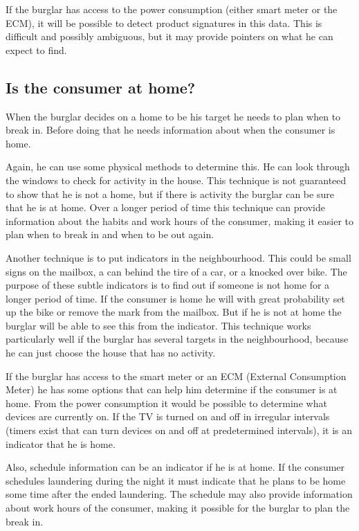 If the burglar has access to the power consumption (either smart meter or the ECM), it will be possible to detect product signatures in this data.
This is difficult and possibly ambiguous, but it may provide pointers on what he can expect to find.

\subsection{Is the consumer at home?}
When the burglar decides on a home to be his target he needs to plan when to break in.
Before doing that he needs information about when the consumer is home.

Again, he can use some physical methods to determine this.
He can look through the windows to check for activity in the house.
This technique is not guaranteed to show that he is not a home, but if there is activity the burglar can be sure that he is at home.
Over a longer period of time this technique can provide information about the habits and work hours of the consumer, making it easier to plan when to break in and when to be out again.

Another technique is to put indicators in the neighbourhood.
This could be small signs on the mailbox, a can behind the tire of a car, or a knocked over bike.
The purpose of these subtle indicators is to find out if someone is not home for a longer period of time.
If the consumer is home he will with great probability set up the bike or remove the mark from the mailbox.
But if he is not at home the burglar will be able to see this from the indicator.
This technique works particularly well if the burglar has several targets in the neighbourhood, because he can just choose the house that has no activity.

If the burglar has access to the smart meter or an ECM (External Consumption Meter) he has some options that can help him determine if the consumer is at home.
From the power consumption it would be possible to determine what devices are currently on. 
If the TV is turned on and off in irregular intervals (timers exist that can turn devices on and off at predetermined intervals), it is an indicator that he is home.

Also, schedule information can be an indicator if he is at home.
If the consumer schedules laundering during the night it must indicate that he plans to be home some time after the ended laundering.
The schedule may also provide information about work hours of the consumer, making it possible for the burglar to plan the break in.

